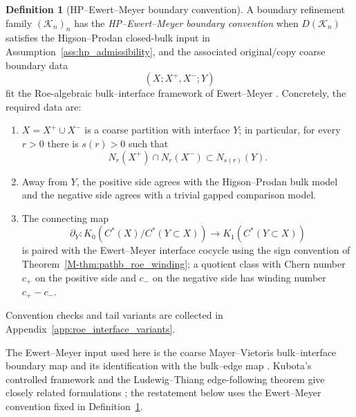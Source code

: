 \documentclass[11pt]{article}
\numberwithin{equation}{section}
\theoremstyle{definition}
\newtheorem{definition}[theorem]{Definition}
\theoremstyle{remark}
\newcommand{\K}{\mathcal{K}}
\begin{document}
\begin{definition}[HP--Ewert--Meyer boundary convention]\label{def:hp_em_admissible}\label{ass:coarse_bec}
A boundary refinement family \((\K_n)_n\) has the \emph{HP--Ewert--Meyer boundary convention} when
\(D(\K_n)\) satisfies the Higson--Prodan closed-bulk input in
Assumption~\ref{ass:hp_admissibility}, and the associated original/copy coarse boundary data
\[
(X;X^+,X^-;Y)
\]
fit the Roe-algebraic bulk--interface framework of Ewert--Meyer \cite{EwertMeyer2019}.
Concretely, the required data are:
\begin{enumerate}[label=(\alph*),leftmargin=2em]
\item \(X=X^+\cup X^-\) is a coarse partition with interface \(Y\); in particular, for every
  \(r>0\) there is \(s(r)>0\) such that
  \[
  N_r(X^+)\cap N_r(X^-)\subset N_{s(r)}(Y).
  \]
\item Away from \(Y\), the positive side agrees with the Higson--Prodan bulk model and the
  negative side agrees with a trivial gapped comparison model.
\item The connecting map
  \[
  \partial_Y:K_0(C^*(X)/C^*(Y\subset X))\longrightarrow K_1(C^*(Y\subset X))
  \]
  is paired with the Ewert--Meyer interface cocycle using the sign convention of
  Theorem~\ref{M-thm:pathb_roe_winding}; a quotient class with Chern number \(c_+\) on the positive
  side and \(c_-\) on the negative side has winding number \(c_+-c_-\).
\end{enumerate}
\end{definition}

Convention checks and tail variants are collected in Appendix~\ref{app:roe_interface_variants}.

The Ewert--Meyer input used here is the coarse Mayer--Vietoris bulk--interface boundary map and
its identification with the bulk--edge map
\cite[Propositions~3.2.1--3.2.2 and Corollary~3.2.3]{EwertMeyer2019}. Kubota's controlled
framework and the Ludewig--Thiang edge-following theorem give closely related formulations
\cite{KubotaControlled,LudewigThiangEdge}; the restatement below uses the Ewert--Meyer convention
fixed in Definition~\ref{def:hp_em_admissible}.

\begin{center}
\end{center}
\end{document}

